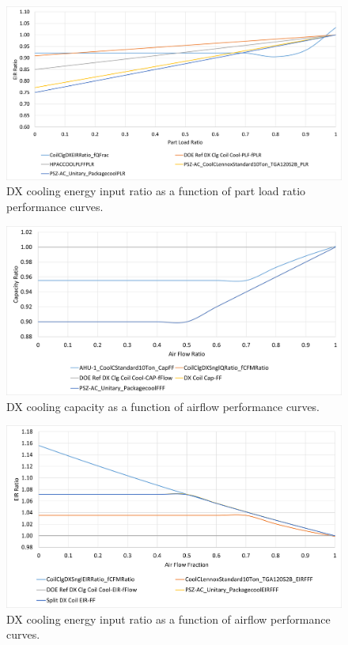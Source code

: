 \begin{figure}
    \centering \includegraphics[width=1.0\textwidth]{figures/EIRFPLR.png}
    \caption[DX cooling energy input ratio as a function of part load ratio performance curves]{DX cooling energy input ratio as a function of part load ratio performance curves.}
    \label{fig:dx_eirfplr}
\end{figure}

\begin{figure}
    \centering \includegraphics[width=1.0\textwidth]{figures/CAPFF.png}
    \caption[DX cooling capacity as a function of airflow performance curves]{DX cooling capacity as a function of airflow performance curves.}
    \label{fig:dx_capff}
\end{figure}

\begin{figure}
    \centering \includegraphics[width=1.0\textwidth]{figures/EIRFF.png}
    \caption[DX cooling energy input ratio as a function of airflow performance curves]{DX cooling energy input ratio as a function of airflow performance curves.}
    \label{fig:dx_eirff}
\end{figure}

